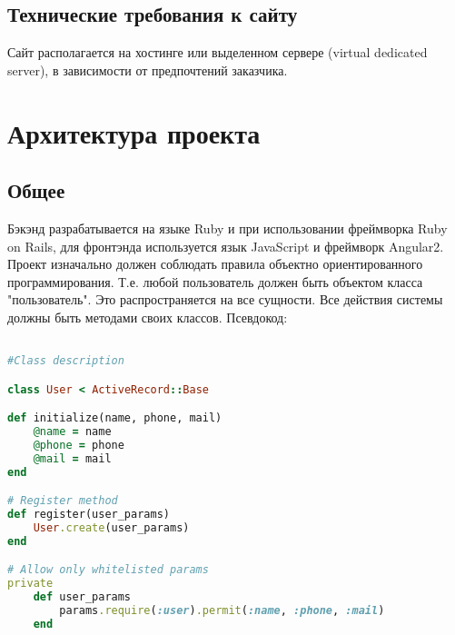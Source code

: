 \documentclass[DIV=calc, paper=a4, fontsize=11pt]{scrartcl} %
\begin{document}
\subsection{Технические требования к сайту}
Сайт располагается на хостинге или выделенном сервере (virtual dedicated server), в зависимости от предпочтений заказчика.



\section{Архитектура проекта}

\subsection{Общее}
Бэкэнд разрабатывается на языке Ruby и при использовании фреймворка Ruby on Rails, для фронтэнда используется язык JavaScript и фреймворк Angular2.
\\[0.5cm]
Проект изначально должен соблюдать правила объектно ориентированного программирования. Т.е. любой пользователь должен быть объектом класса "пользователь". Это распространяется на все сущности. Все действия системы должны быть методами своих классов. Псевдокод:
\begin{lstlisting}[language=Ruby]

#Class description

class User < ActiveRecord::Base 

def initialize(name, phone, mail)
	@name = name
	@phone = phone
	@mail = mail
end

# Register method
def register(user_params)
	User.create(user_params)
end

# Allow only whitelisted params
private
	def user_params
		params.require(:user).permit(:name, :phone, :mail)
	end
\end{lstlisting}
\end{document}
